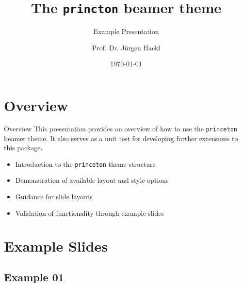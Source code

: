 \documentclass[aspectratio=169]{beamer}
\title{The \texttt{princton} beamer theme}
\subtitle{Example Presentation}
\date{\today}
\author[Hackl]{Prof. Dr. Jürgen Hackl}
\institute[PU]{Princeton University}
\begin{document}
\maketitle

\section{Overview}

\begin{frame}[t]{Overview}
  This presentation provides an overview of how to use the \texttt{princeton} beamer theme. 
  It also serves as a unit test for developing further extensions to this package.
  \begin{itemize}
  \item Introduction to the \texttt{princeton} theme structure
  \item Demonstration of available layout and style options
  \item Guidance for slide layouts
  \item Validation of functionality through example slides
  \end{itemize}
\end{frame}


\section{Example Slides}

\subsection{Example 01}
\end{document}
